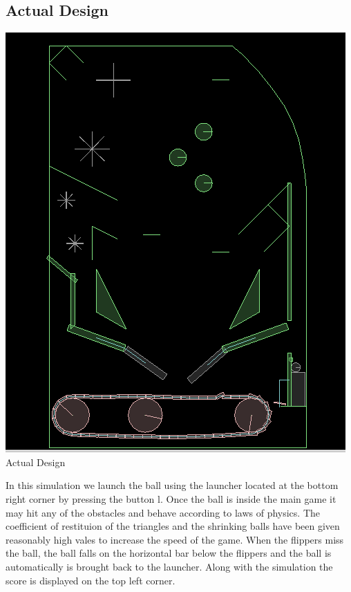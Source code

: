 \documentclass[11pt]{article}
\begin{document}
\subsection{Actual Design}
\begin{center}
\includegraphics[scale=0.5]{../plots/full.png}\\
Actual Design
\end{center}
In this simulation we launch the ball using the launcher located at the bottom right corner by pressing the button l. Once the ball is inside the main game
it may hit any of the obstacles and behave according to laws of physics. The coefficient of restituion of the triangles and the shrinking balls have been given reasonably high vales to increase the speed of the game. When the flippers miss the ball, the ball falls on the horizontal bar below the flippers and the ball is automatically is brought back to the launcher. Along with the simulation the score is displayed on the top left corner.\\
\end{document}

